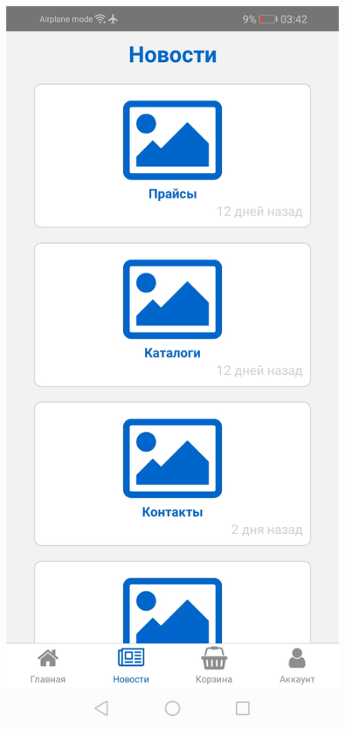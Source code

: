\begin{figure}[!p]\centering
    \begin{minipage}{0.19\textwidth}
        \centering

        \includegraphics[width=.99\linewidth]
        {images/android/articles.jpg}
    \end{minipage}
    \begin{minipage}{0.19\textwidth}
        \centering


\end{minipage}
\end{figure}
